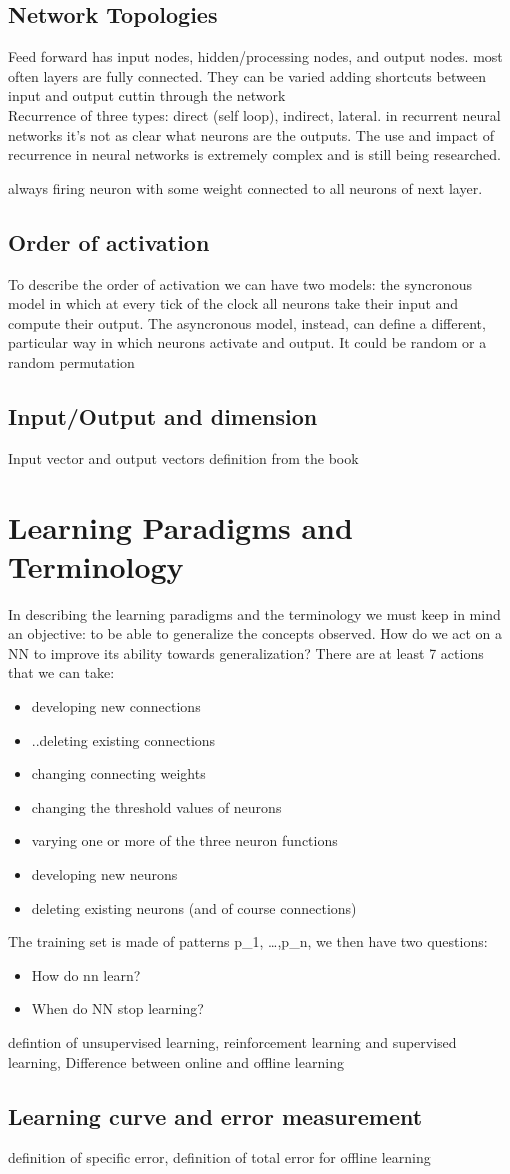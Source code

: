 \subsection*{Network Topologies}
Feed forward has input nodes, hidden/processing nodes, and output nodes. most often layers are fully connected. They can be varied adding shortcuts between input and output cuttin through the network\\
Recurrence of three types: direct (self loop), indirect, lateral. in recurrent neural networks it's not as clear what neurons are the outputs. The use and impact of recurrence in neural networks is extremely complex and is still being researched.
\begin{definition}
    always firing neuron with some weight connected to all neurons of next layer.
\end{definition}
\subsection{Order of activation}
To describe the order of activation we can have two models:
the syncronous model in which at every tick of the clock all neurons take their input and compute their output. The asyncronous model, instead, can define a different, particular way in which neurons activate and output. It could be random or a random permutation
\subsection*{Input/Output and dimension}
Input vector and output vectors definition from the book
\section{Learning Paradigms and Terminology}
In describing the learning paradigms and the terminology we must keep in mind an objective: to be able to generalize the concepts observed. How do we act on a NN to improve its ability towards generalization? There are at least 7 actions that we can take:
\begin{itemize}
    \item developing new connections
    \item ..deleting existing connections
    \item changing connecting weights
    \item changing the threshold values of neurons
    \item varying one or more of the three neuron functions
    \item developing new neurons
    \item deleting existing neurons (and of course connections)
\end{itemize}
The training set is made of patterns p_{1}, \ldots,p_{n}, we then have two questions:
\begin{itemize}
    \item How do nn learn?
    \item When do NN stop learning?
\end{itemize}
defintion of unsupervised learning, reinforcement learning and supervised learning, Difference between online and offline learning
\subsection*{Learning curve and error measurement}
definition of specific error, definition of total error for offline learning